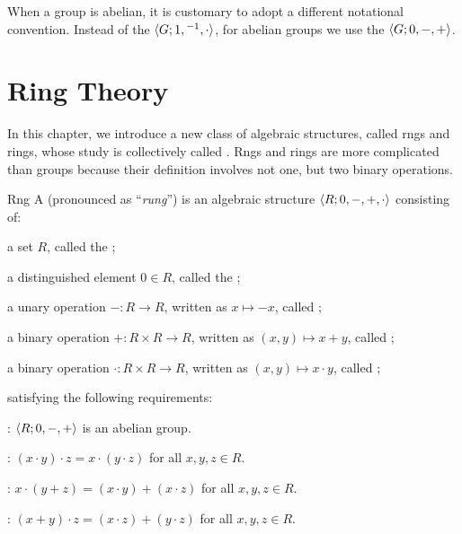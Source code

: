 \documentclass[12pt]{report}
\begin{document}
When a group is abelian, it is customary to adopt a different notational convention. Instead of the  ${\langle {G; 1, {}^{-1}, \cdot} \rangle}$, for abelian groups we use the  ${\langle {G; 0, -, +} \rangle}$.



\chapter{Ring Theory}

In this chapter, we introduce a new class of algebraic structures, called rngs and rings, whose study is collectively called . Rngs and rings are more complicated than groups because their definition involves not one, but two binary operations.

\begin{dfnbox}{Rng}
	A  (pronounced as ``\textit{rung}'') is an algebraic structure ${\langle {R; 0, -, +, \cdot} \rangle}$ consisting of:
	\begin{dfnitems}
		\item a set $R$, called the ;
		\item a distinguished element $0 \in R$, called the ;
		\item a unary operation $-: R \to R$, written as $x \mapsto -x$, called ;
		\item a binary operation $+: R \times R \to R$, written as $(x, y) \mapsto x + y$, called ;
		\item a binary operation $\cdot: R \times R \to R$, written as $(x, y) \mapsto x \cdot y$, called ;
	\end{dfnitems}
	satisfying the following requirements:
	\begin{dfnitems}
		\item {}: ${\langle {R; 0, -, +} \rangle}$ is an abelian group.
		\item {}: $(x \cdot y) \cdot z = x \cdot (y \cdot z)$ for all $x, y, z \in R$.
		\item {}: $x \cdot (y + z) = (x \cdot y) + (x \cdot z)$ for all $x, y, z \in R$.
		\item {}: $(x + y) \cdot z = (x \cdot z) + (y \cdot z)$ for all $x, y, z \in R$.
	\end{dfnitems}
\end{dfnbox}
\end{document}
